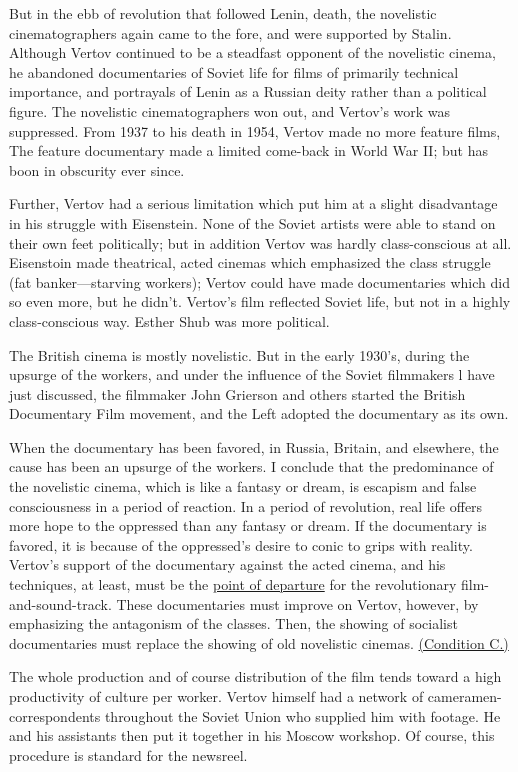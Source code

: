 But in the ebb of revolution that followed Lenin, death, the novelistic 
cinematographers again came to the fore, and were supported by Stalin.
Although Vertov continued to be a steadfast opponent
of the novelistic cinema, he abandoned documentaries of
Soviet life for films of primarily technical importance, and portrayals
of Lenin as a Russian deity rather than a political figure.
The novelistic cinematographers won out, and Vertov's work was 
suppressed. From 1937 to his death in 1954, Vertov made no 
more feature films, The feature documentary made a limited come-back
in World War II; but has boon in obscurity ever since. 

Further, Vertov had a serious limitation which put him at a slight disadvantage in his struggle with Eisenstein. None of the Soviet artists were able to stand on their own feet politically; but in addition Vertov was hardly class-conscious at all. Eisenstoin made theatrical, acted cinemas which emphasized the class struggle (fat banker---starving workers); Vertov could have made documentaries which did so even more, but he didn't. Vertov's film reflected Soviet life, but not in a highly class-conscious way. Esther Shub was more political. 

The British cinema is mostly novelistic. But in the early 1930's, during the upsurge of the workers, and under the influence of the Soviet filmmakers l have just discussed, the filmmaker John Grierson and others started the British Documentary Film movement, and the Left adopted the documentary as its own. 

When the documentary has been favored, in Russia, Britain, and elsewhere, the cause has been an upsurge of the workers. I conclude that the predominance of the novelistic cinema, which is like a fantasy or dream, is escapism and false consciousness in a period of reaction. In a period of revolution, real life offers more hope to the oppressed than any fantasy or dream. If the documentary is favored, it is because of the oppressed's desire to conic to grips with reality. Vertov's support of the documentary against the acted cinema, and his techniques, at least, must be the \uline{point of departure} for the revolutionary film-and-sound-track. These documentaries must improve on Vertov, however, by emphasizing the antagonism of the classes. Then, the showing of socialist documentaries must replace the showing of old novelistic cinemas. \uline{(Condition C.)}

The whole production and of course distribution of the film tends toward a high productivity of culture per worker. Vertov himself had a network of cameramen-correspondents throughout the Soviet Union who supplied him with footage. He and his assistants then put it together in his Moscow workshop. Of course, this procedure is standard for the newsreel. 

